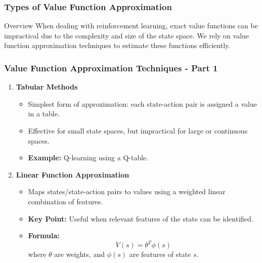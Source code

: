 \documentclass[aspectratio=169]{beamer}
\begin{document}
\begin{frame}[fragile]
    \frametitle{Types of Value Function Approximation}
    \begin{block}{Overview}
        When dealing with reinforcement learning, exact value functions can be impractical due to the complexity and size of the state space. 
        We rely on value function approximation techniques to estimate these functions efficiently.
    \end{block}
\end{frame}

\begin{frame}[fragile]
    \frametitle{Value Function Approximation Techniques - Part 1}
    \begin{enumerate}
        \item \textbf{Tabular Methods}
            \begin{itemize}
                \item Simplest form of approximation: each state-action pair is assigned a value in a table.
                \item Effective for small state spaces, but impractical for large or continuous spaces.
                \item \textbf{Example:} Q-learning using a Q-table.
            \end{itemize}
        \item \textbf{Linear Function Approximation}
            \begin{itemize}
                \item Maps states/state-action pairs to values using a weighted linear combination of features.
                \item \textbf{Key Point:} Useful when relevant features of the state can be identified.
                \item \textbf{Formula:} 
                \begin{equation}
                    V(s) = \theta^T \phi(s)
                \end{equation}
                where \( \theta \) are weights, and \( \phi(s) \) are features of state \( s \).
            \end{itemize}
    \end{enumerate}
\end{frame}
\end{document}
